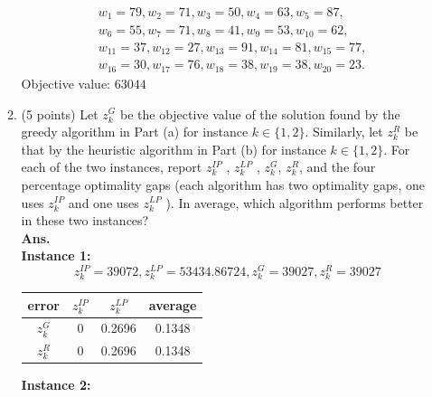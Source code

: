 \documentclass[12pt]{article}
\begin{document}
\begin{enumerate}
\begin{enumerate}
\begin{align*}
                               & w_{1} = 79, w_{2} = 71, w_{3} = 50, w_{4} = 63, w_{5} = 87,      \\
                               & w_{6} = 55, w_{7} = 71, w_{8} = 41, w_{9} = 53, w_{10} = 62,     \\
                               & w_{11} = 37, w_{12} = 27, w_{13} = 91, w_{14} = 81, w_{15} = 77, \\
                               & w_{16} = 30, w_{17} = 76, w_{18} = 38, w_{19} = 38, w_{20} = 23.
                        \end{align*}
                        Objective value:  $63044$
                  \item (5 points) Let $z_k^G$ be the objective value of the solution found by the greedy algorithm in Part (a) for instance $k \in \{1,2\}$. Similarly, let $z_k^R$ be that by the heuristic algorithm in Part (b) for instance $k \in \{1, 2\}$. For each of the two instances, report $z_k^{IP}$ , $z_k^{LP}$ , $z_k^G$, $z_k^R$, and the four percentage optimality gaps (each algorithm has two optimality gaps, one uses $z_k^{IP}$ and one uses $z_k^{LP}$ ). In average, which algorithm performs better in these two instances?\\
                        \textbf{Ans.}\\
                        \textbf{Instance 1:}
                        \begin{equation*}
                              z^{IP}_k = 39072, z^{LP} _k= 53434.86724, z^{G}_k = 39027, z^{R}_k = 39027
                        \end{equation*}
                        \begin{table}[H]
                              \centering
                              \begin{tabular}{c|c|c|c}
                                    error     & $z^{IP}_k$ & $z^{LP}_k$ & average \\
                                    \hline
                                    $z^{G}_k$ & 0          & 0.2696     & 0.1348  \\
                                    \hline
                                    $z^{R}_k$ & 0          & 0.2696     & 0.1348  \\
                              \end{tabular}
                        \end{table}
                        \textbf{Instance 2:}
                        \begin{equation*}

\end{equation*}
\end{enumerate}
\end{enumerate}
\end{document}
